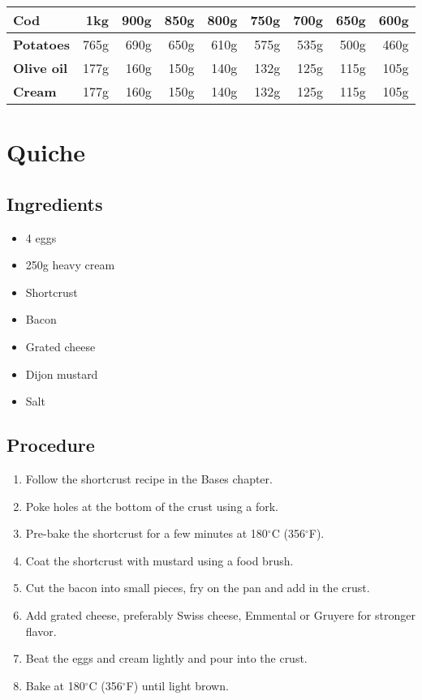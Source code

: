 \documentclass[10pt]{book}
\newcommand{\degree}{$^\circ$}
\begin{document}
	\begin{center}
	\begin{tabular}{l | r | r | r | r | r | r | r | r}
		\textbf{Cod} 		& 1kg 	& 900g & 850g & 800g & 750g & 700g & 650g & 600g\\
		\hline\hline
		\textbf{Potatoes} 	& 765g 	& 690g & 650g & 610g & 575g & 535g & 500g & 460g\\
		\hline
		\textbf{Olive oil} 	& 177g 	& 160g & 150g & 140g & 132g & 125g & 115g & 105g\\
		\hline
		\textbf{Cream}	 	& 177g 	& 160g & 150g & 140g & 132g & 125g & 115g & 105g\\
	\end{tabular}
	\end{center}
	
\newpage


\newpage
\section*{Quiche}
\subsection*{Ingredients}
	\begin{itemize}
		\item 4 eggs
		\item 250g heavy cream
		\item Shortcrust
		\item Bacon
		\item Grated cheese
		\item Dijon mustard
		\item Salt
	\end{itemize}
\subsection*{Procedure}
	\begin{enumerate}
		\item Follow the shortcrust recipe in the Bases chapter.
		\item Poke holes at the bottom of the crust using a fork.
		\item Pre-bake the shortcrust for a few minutes at 180{\degree}C (356{\degree}F).
		\item Coat the shortcrust with mustard using a food brush.
		\item Cut the bacon into small pieces, fry on the pan and add in the crust.
		\item Add grated cheese, preferably Swiss cheese, Emmental or Gruyere for stronger flavor.
		\item Beat the eggs and cream lightly and pour into the crust.
		\item Bake at 180{\degree}C (356{\degree}F) until light brown.
	\end{enumerate}
\newpage
\end{document}
